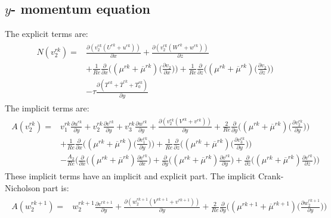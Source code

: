 \documentclass[preprint,12pt]{article}
\begin{document}
\subsection{$y$- momentum equation}
The explicit terms are:
\begin{align}\begin{split}
N(v_2^{rk})=&\frac{\partial (v_2^{rk}(U^{rk}+u^{rk}))}{\partial x}+\frac{\partial (v_2^{rk}(W^{rk}+w^{rk}))}{\partial z}\\&+\frac{1}{Re}\frac{\partial}{\partial x}\Big(({\mu^{rk}}+\overline{\mu}^{rk})\Big(\frac{\partial v_2}{\partial x}\Big)\Big)+\frac{1}{Re}\frac{\partial}{\partial z}\Big(({\mu^{rk}}+\overline{\mu}^{rk})\Big(\frac{\partial v_2}{\partial z}\Big)\Big)\\&-\tau\frac{\partial (T^{rk}+\overline{T}^{rk}+T_0^{rk})}{\partial y}
\end{split} \end{align}	
The implicit terms are:
\begin{align}\begin{split}
A(v_2^{rk})=&v_1^{rk}\frac{\partial u^{rk}}{\partial y}+v_2^{rk}\frac{\partial v^{rk}}{\partial y}+v_3^{rk}\frac{\partial w^{rk}}{\partial y}+\frac{\partial (v_2^{rk}(V^{rk}+v^{rk}))}{\partial y}+\frac{2}{Re}\frac{\partial}{\partial y}\Big(({\mu^{rk}}+\overline{\mu}^{rk})\Big(\frac{\partial v_2^{rk}}{\partial y}\Big)\Big)\\&+\frac{1}{Re}\frac{\partial}{\partial x}\Big(({\mu^{rk}}+\overline{\mu}^{rk})\Big(\frac{\partial v_1^{rk}}{\partial y}\Big)\Big)+\frac{1}{Re}\frac{\partial}{\partial z}\Big(({\mu}^{rk}+\overline{\mu}^{rk})\Big(\frac{\partial v_3^{rk}}{\partial y}\Big)\Big)\\&-\frac{A_2}{Re}\Bigg(\frac{\partial}{\partial x}\Big((\mu^{rk}+\overline{\mu}^{rk})\frac{\partial v^{rk}}{\partial x}\Big)+\frac{\partial}{\partial y}\Big((\mu^{rk}+\overline{\mu}^{rk})\frac{\partial v^{rk}}{\partial y}\Big)+\frac{\partial}{\partial z}\Big((\mu^{rk}+\overline{\mu}^{rk})\frac{\partial v^{rk}}{\partial z}\Big)\Bigg)
\end{split} \end{align}	
These implicit terms have an implicit and explicit part. The implicit Crank- Nicholson part is:
\begin{align}\begin{split}
A(w_2^{rk+1})=&w_2^{rk+1}\frac{\partial v^{rk+1}}{\partial y}+\frac{\partial (w_2^{rk+1}(V^{rk+1}+v^{rk+1}))}{\partial y}+\frac{2}{Re}\frac{\partial}{\partial y}\Big(({\mu}^{rk+1}+\overline{\mu}^{rk+1})\Big(\frac{\partial w_2^{rk+1}}{\partial y}\Big)\Big)
\end{split} \end{align}	
\end{document}
